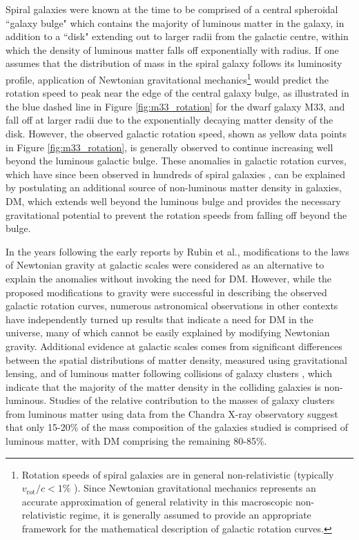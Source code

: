 Spiral galaxies were known at the time to be comprised of a central spheroidal ``galaxy bulge" which contains the majority of luminous matter in the galaxy, in addition to a ``disk" extending out to larger radii from the galactic centre, within which the density of luminous matter falls off exponentially with radius. If one assumes that the distribution of mass in the spiral galaxy follows its luminosity profile, application of Newtonian gravitational mechanics\footnote{Rotation speeds of spiral galaxies are in general non-relativistic (typically \(v_\text{rot}/c<1\%\) \cite{rotn_curves_1995}). Since Newtonian gravitational mechanics represents an accurate approximation of general relativity in this macroscopic non-relativistic regime, it is generally assumed to provide an appropriate framework for the mathematical description of galactic rotation curves.} would predict the rotation speed to peak near the edge of the central galaxy bulge, as illustrated in the blue dashed line in Figure \ref{fig:m33_rotation} for the dwarf galaxy M33, and fall off at larger radii due to the exponentially decaying matter density of the disk. However, the observed galactic rotation speed, shown as yellow data points in Figure \ref{fig:m33_rotation}, is generally observed to continue increasing well beyond the luminous galactic bulge. These anomalies in galactic rotation curves, which have since been observed in hundreds of spiral galaxies \cite{rotn_curves_1995}, can be explained by postulating an additional source of non-luminous matter density in galaxies, DM, which extends well beyond the luminous bulge and provides the necessary gravitational potential to prevent the rotation speeds from falling off beyond the bulge.

In the years following the early reports by Rubin et al., modifications to the laws of Newtonian gravity at galactic scales \cite{mond_1983} were considered as an alternative to explain the anomalies without invoking the need for DM. However, while the proposed modifications to gravity were successful in describing the observed galactic rotation curves, numerous astronomical observations in other contexts have independently turned up results that indicate a need for DM in the universe, many of which cannot be easily explained by modifying Newtonian gravity. Additional evidence at galactic scales comes from significant differences between the spatial distributions of matter density, measured using gravitational lensing, and of luminous matter following collisions of galaxy clusters \cite{bullet_1995}, which indicate that the majority of the matter density in the colliding galaxies is non-luminous. Studies of the relative contribution to the masses of galaxy clusters from luminous matter using data from the Chandra X-ray observatory \cite{Chandra_2013} suggest that only 15-20\% of the mass composition of the galaxies studied is comprised of luminous matter, with DM comprising the remaining 80-85\%.

